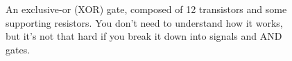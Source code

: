 \begin{figure}[h!]
\begin{center}

\caption{An exclusive-or (XOR) gate, composed of 12 transistors and some supporting resistors. You don't need to understand how it works, but it's not that hard if you break it down into signals and AND gates.}
\label{fig:xorgate}
\end{center}
\end{figure}

\clearpage


